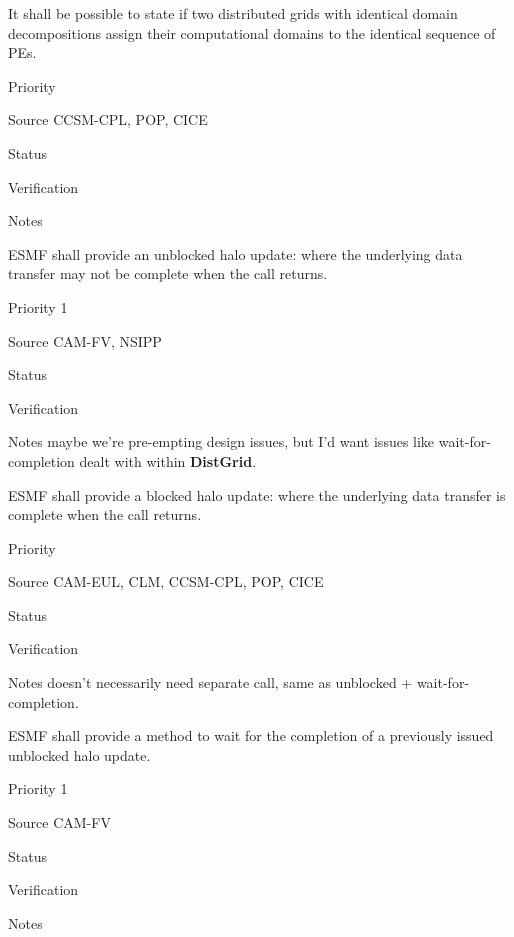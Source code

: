 
It shall be possible to state if two distributed grids with identical
domain decompositions assign their computational domains to the
identical sequence of PEs.

\begin{reqlist}
\item[Priority]
\item[Source] CCSM-CPL, POP, CICE
\item[Status]
\item[Verification]
\item[Notes]
\end{reqlist}

 \label{DG:halo}


ESMF shall provide an unblocked halo update: where the underlying
data transfer may not be complete when the call returns.

\begin{reqlist}
\item[Priority] 1
\item[Source] CAM-FV, NSIPP
\item[Status]
\item[Verification]
\item[Notes] maybe we're pre-empting design issues, but I'd want
  issues like wait-for-completion dealt with within \textbf{DistGrid}.
\end{reqlist}


ESMF shall provide a blocked halo update: where the underlying
data transfer is complete when the call returns.

\begin{reqlist}
\item[Priority]
\item[Source] CAM-EUL, CLM, CCSM-CPL, POP, CICE
\item[Status]
\item[Verification]
\item[Notes] doesn't necessarily need separate call, same as unblocked
  + wait-for-completion.
\end{reqlist}


ESMF shall provide a method to wait for the completion of a previously
issued unblocked halo update.

\begin{reqlist}
\item[Priority] 1
\item[Source] CAM-FV
\item[Status]
\item[Verification]
\item[Notes]
\end{reqlist}

